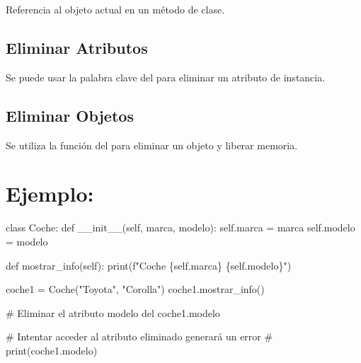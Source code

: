 \documentclass[
  a4paper,
  onepage,
  openany]{scrreprt}
\newenvironment{Shaded}{\begin{snugshade}}{\end{snugshade}}
\newcommand{\BuiltInTok}[1]{\textcolor[rgb]{0.00,0.23,0.31}{#1}}
\newcommand{\CommentTok}[1]{\textcolor[rgb]{0.37,0.37,0.37}{#1}}
\newcommand{\FunctionTok}[1]{\textcolor[rgb]{0.28,0.35,0.67}{#1}}
\newcommand{\KeywordTok}[1]{\textcolor[rgb]{0.00,0.23,0.31}{#1}}
\newcommand{\NormalTok}[1]{\textcolor[rgb]{0.00,0.23,0.31}{#1}}
\newcommand{\OperatorTok}[1]{\textcolor[rgb]{0.37,0.37,0.37}{#1}}
\newcommand{\SpecialCharTok}[1]{\textcolor[rgb]{0.37,0.37,0.37}{#1}}
\newcommand{\SpecialStringTok}[1]{\textcolor[rgb]{0.13,0.47,0.30}{#1}}
\newcommand{\StringTok}[1]{\textcolor[rgb]{0.13,0.47,0.30}{#1}}
\newcommand{\VariableTok}[1]{\textcolor[rgb]{0.07,0.07,0.07}{#1}}
\begin{document}
Referencia al objeto actual en un método de clase.

\hypertarget{eliminar-atributos}{%
\subsection{Eliminar Atributos}\label{eliminar-atributos}}

Se puede usar la palabra clave del para eliminar un atributo de
instancia.

\hypertarget{eliminar-objetos}{%
\subsection{Eliminar Objetos}\label{eliminar-objetos}}

Se utiliza la función del para eliminar un objeto y liberar memoria.

\hypertarget{ejemplo-54}{%
\section{Ejemplo:}\label{ejemplo-54}}

\begin{Shaded}
\begin{Highlighting}[]
\KeywordTok{class}\NormalTok{ Coche:}
    \KeywordTok{def} \FunctionTok{\_\_init\_\_}\NormalTok{(}\VariableTok{self}\NormalTok{, marca, modelo):}
        \VariableTok{self}\NormalTok{.marca }\OperatorTok{=}\NormalTok{ marca}
        \VariableTok{self}\NormalTok{.modelo }\OperatorTok{=}\NormalTok{ modelo}

    \KeywordTok{def}\NormalTok{ mostrar\_info(}\VariableTok{self}\NormalTok{):}
        \BuiltInTok{print}\NormalTok{(}\SpecialStringTok{f"Coche }\SpecialCharTok{\{}\VariableTok{self}\SpecialCharTok{.}\NormalTok{marca}\SpecialCharTok{\}}\SpecialStringTok{ }\SpecialCharTok{\{}\VariableTok{self}\SpecialCharTok{.}\NormalTok{modelo}\SpecialCharTok{\}}\SpecialStringTok{"}\NormalTok{)}

\NormalTok{coche1 }\OperatorTok{=}\NormalTok{ Coche(}\StringTok{"Toyota"}\NormalTok{, }\StringTok{"Corolla"}\NormalTok{)}
\NormalTok{coche1.mostrar\_info()}

\CommentTok{\# Eliminar el atributo \textquotesingle{}modelo\textquotesingle{}}
\KeywordTok{del}\NormalTok{ coche1.modelo}

\CommentTok{\# Intentar acceder al atributo eliminado generará un error}
\CommentTok{\# print(coche1.modelo)}
\end{Highlighting}
\end{Shaded}
\end{document}
